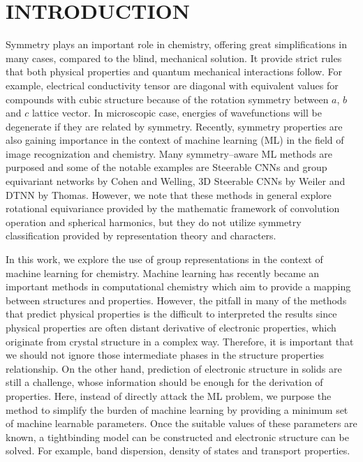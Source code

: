 \documentclass{article}
\begin{document}
\section{INTRODUCTION}

Symmetry plays an important role in chemistry, offering great simplifications in many 
cases, compared to the blind, mechanical solution\cite{albright_orbital_2013}. 
It provide strict rules that both physical properties and quantum mechanical interactions
follow. For example, electrical conductivity tensor are diagonal with equivalent values for 
compounds with cubic structure because of the rotation symmetry between $a$, $b$ and $c$
lattice vector. In microscopic case, energies of wavefunctions will be degenerate if 
they are related by symmetry. Recently, symmetry properties are also gaining importance in 
the context of machine learning (ML) in the field of image recognization and chemistry. 
Many symmetry--aware ML methods are purposed and some of the notable examples are 
Steerable CNNs and group equivariant networks by Cohen and Welling, 3D Steerable CNNs 
by Weiler and DTNN by Thomas. However, we note that these methods in general explore rotational 
equivariance provided by the mathematic framework of convolution operation and 
spherical harmonics, but they do not utilize symmetry classification provided by 
representation theory and characters. 

In this work, we explore the use of group representations in the context of machine learning 
for chemistry. Machine learning has recently became an important methods in computational chemistry which 
aim to provide a mapping between structures and properties. However, the pitfall in many of the 
methods that predict physical properties is the difficult to interpreted the results since physical 
properties are often distant derivative of electronic properties, which originate from crystal structure 
in a complex way. Therefore, it is important that we should not ignore those intermediate phases in the 
structure properties relationship. On the other hand, prediction of electronic structure in solids 
are still a challenge, whose information should be enough for the derivation of properties. 
Here, instead of directly attack the ML problem, we purpose the method to simplify the burden of 
machine learning by providing a minimum set of machine learnable parameters. Once the suitable values 
of these parameters are known, a tightbinding model can be constructed and electronic structure can be solved.
For example, band dispersion, density of states and transport properties.
\end{document}
